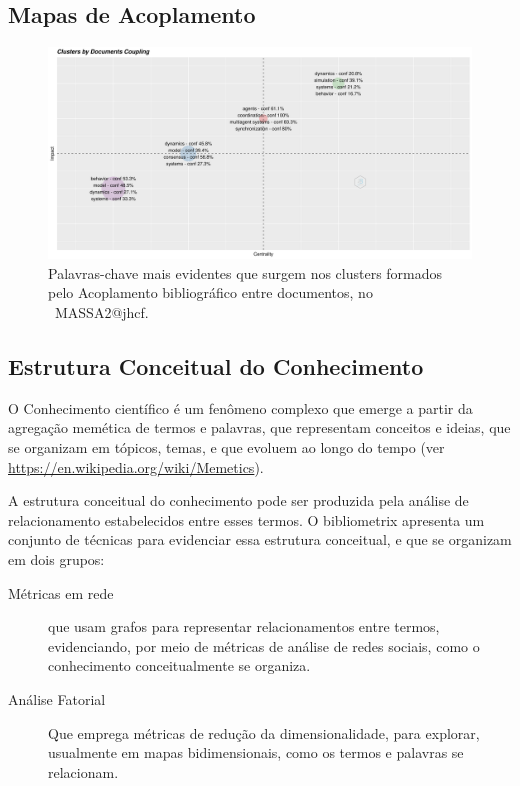 \subsection{Mapas de Acoplamento}

\begin{figure}
    \centering
    \includegraphics[width=1\textwidth]{exploratory-data-analysis/jhcf/PesqBibliogr/SimulacaoMultiagente/WoS-20220203/Clustering/MASSA2-CouplingMap-4Labels-Per-Cluster.png}
    \caption{Palavras-chave mais evidentes que surgem nos clusters formados pelo Acoplamento bibliográfico entre documentos, no  \dataset\ MASSA2@jhcf.}
    \label{fig:MASSA2-CouplingMap-4Labels-Per-Cluster}
\end{figure}


\subsection{Estrutura Conceitual do Conhecimento}

O Conhecimento científico é um fenômeno complexo que emerge a partir da agregação memética de termos e palavras, que representam conceitos e ideias, que se organizam em tópicos, temas, e que evoluem ao longo do tempo (ver \url{https://en.wikipedia.org/wiki/Memetics}).

A estrutura conceitual do conhecimento pode ser produzida pela análise de relacionamento estabelecidos entre esses termos. O bibliometrix apresenta um conjunto de técnicas para evidenciar essa estrutura conceitual, e que se organizam em dois grupos:
\begin{description}
    \item [Métricas em rede] que usam grafos para representar relacionamentos entre termos, evidenciando, por meio de métricas de análise de redes sociais, como o conhecimento conceitualmente se organiza.
    \item [Análise Fatorial] Que emprega métricas de redução da dimensionalidade, para explorar, usualmente em mapas bidimensionais, como os termos e palavras se relacionam. 
\end{description}

